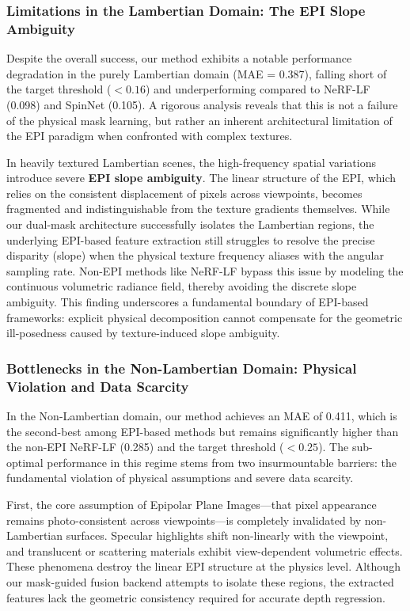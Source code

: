 \documentclass[lettersize,journal]{IEEEtran}
\begin{document}
\subsubsection{Limitations in the Lambertian Domain: The EPI Slope Ambiguity}
Despite the overall success, our method exhibits a notable performance degradation in the purely Lambertian domain (MAE = 0.387), falling short of the target threshold ($< 0.16$) and underperforming compared to NeRF-LF (0.098) and SpinNet (0.105). A rigorous analysis reveals that this is not a failure of the physical mask learning, but rather an inherent architectural limitation of the EPI paradigm when confronted with complex textures.

In heavily textured Lambertian scenes, the high-frequency spatial variations introduce severe \textbf{EPI slope ambiguity}. The linear structure of the EPI, which relies on the consistent displacement of pixels across viewpoints, becomes fragmented and indistinguishable from the texture gradients themselves. While our dual-mask architecture successfully isolates the Lambertian regions, the underlying EPI-based feature extraction still struggles to resolve the precise disparity (slope) when the physical texture frequency aliases with the angular sampling rate. Non-EPI methods like NeRF-LF bypass this issue by modeling the continuous volumetric radiance field, thereby avoiding the discrete slope ambiguity. This finding underscores a fundamental boundary of EPI-based frameworks: explicit physical decomposition cannot compensate for the geometric ill-posedness caused by texture-induced slope ambiguity.

\subsubsection{Bottlenecks in the Non-Lambertian Domain: Physical Violation and Data Scarcity}
In the Non-Lambertian domain, our method achieves an MAE of 0.411, which is the second-best among EPI-based methods but remains significantly higher than the non-EPI NeRF-LF (0.285) and the target threshold ($< 0.25$). The sub-optimal performance in this regime stems from two insurmountable barriers: the fundamental violation of physical assumptions and severe data scarcity.

First, the core assumption of Epipolar Plane Images---that pixel appearance remains photo-consistent across viewpoints---is completely invalidated by non-Lambertian surfaces. Specular highlights shift non-linearly with the viewpoint, and translucent or scattering materials exhibit view-dependent volumetric effects. These phenomena destroy the linear EPI structure at the physics level. Although our mask-guided fusion backend attempts to isolate these regions, the extracted features lack the geometric consistency required for accurate depth regression. 
\end{document}
